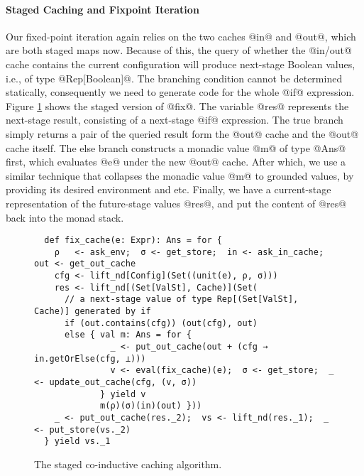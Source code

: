 \paragraph{Staged Caching and Fixpoint Iteration} Our fixed-point iteration
again relies on the two caches @in@ and @out@, which are both staged maps now.
Because of this, the query of whether the @in/out@ cache contains the current
configuration will produce next-stage Boolean values, i.e., of type
@Rep[Boolean]@. The branching condition cannot be determined
statically, consequently we need to generate code for the whole @if@ expression. Figure
\ref{fig:staged_coind_cache} shows the staged version of @fix@. The
variable @res@ represents the next-stage result, consisting of a next-stage
@if@ expression. The true branch simply returns a pair of the queried result
form the @out@ cache and the @out@ cache itself. The else branch constructs a
monadic value @m@ of type @Ans@ first, which evaluates @e@ under the new @out@
cache.  After which, we use a similar technique that collapses the monadic
value @m@ to grounded values, by providing its desired environment and etc.
Finally, we have a current-stage representation of the future-stage values
@res@, and put the content of @res@ back into the monad stack.

\begin{figure}[t]
\centering
\begin{lstlisting}
  def fix_cache(e: Expr): Ans = for {
    ρ   <- ask_env;  σ <- get_store;  in <- ask_in_cache;  out <- get_out_cache
    cfg <- lift_nd[Config](Set((unit(e), ρ, σ)))
    res <- lift_nd[(Set[ValSt], Cache)](Set(
      // a next-stage value of type Rep[(Set[ValSt], Cache)] generated by if
      if (out.contains(cfg)) (out(cfg), out)
      else { val m: Ans = for {
               _ <- put_out_cache(out + (cfg → in.getOrElse(cfg, ⊥)))
               v <- eval(fix_cache)(e);  σ <- get_store;  _ <- update_out_cache(cfg, (v, σ))
             } yield v
             m(ρ)(σ)(in)(out) }))
    _ <- put_out_cache(res._2);  vs <- lift_nd(res._1);  _ <- put_store(vs._2)
  } yield vs._1
\end{lstlisting}
\vspace{-0.5em}
\caption{The staged co-inductive caching algorithm.}
\label{fig:staged_coind_cache}
\vspace{-1.5em}
\end{figure}

